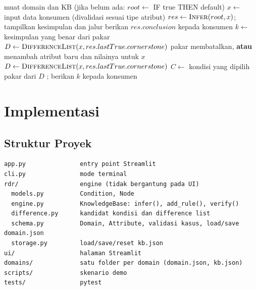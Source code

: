 \documentclass[11pt,a4paper]{article}
\begin{document}
\begin{algorithm}[H]
\caption{Siklus Konsultasi}
\begin{algorithmic}[1]
\State muat domain dan KB (jika belum ada: $root \gets$ IF true THEN default)
\Loop
  \State $x \gets$ input data konsumen (divalidasi sesuai tipe atribut)
  \State $res \gets \Call{Infer}{root, x}$; tampilkan kesimpulan dan jalur
    \State berikan $res.conclusion$ kepada konsumen
  \Else
    \State $k \gets$ kesimpulan yang benar dari pakar
    \State $D \gets \Call{DifferenceList}{x, res.lastTrue.cornerstone}$
     
      \State pakar membatalkan, \textbf{atau} menambah atribut baru dan nilainya untuk $x$
      \State $D \gets \Call{DifferenceList}{x, res.lastTrue.cornerstone}$
    \EndWhile
    \State $C \gets$ kondisi yang dipilih pakar dari $D$
    \State {}; berikan $k$ kepada konsumen
  \EndIf
\EndLoop
\end{algorithmic}
\end{algorithm}

\section{Implementasi}

\subsection{Struktur Proyek}
\begin{lstlisting}
app.py               entry point Streamlit
cli.py               mode terminal
rdr/                 engine (tidak bergantung pada UI)
  models.py          Condition, Node
  engine.py          KnowledgeBase: infer(), add_rule(), verify()
  difference.py      kandidat kondisi dan difference list
  schema.py          Domain, Attribute, validasi kasus, load/save domain.json
  storage.py         load/save/reset kb.json
ui/                  halaman Streamlit
domains/             satu folder per domain (domain.json, kb.json)
scripts/             skenario demo
tests/               pytest
\end{lstlisting}
\end{document}

